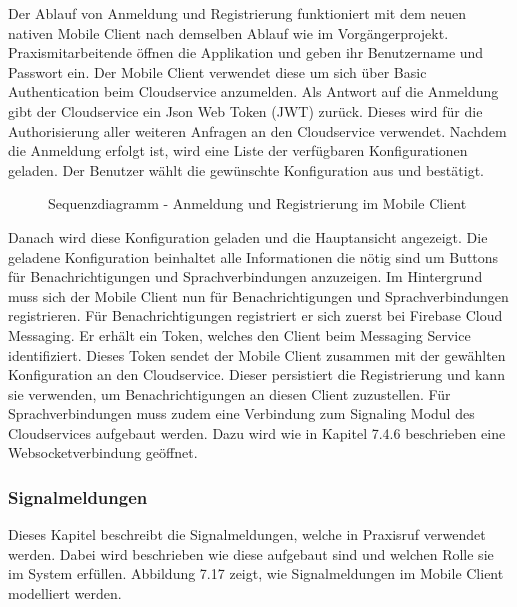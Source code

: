 Der Ablauf von Anmeldung und Registrierung funktioniert mit dem neuen nativen Mobile Client nach demselben Ablauf wie im Vorgängerprojekt.
Praxismitarbeitende öffnen die Applikation und geben ihr Benutzername und Passwort ein.
Der Mobile Client verwendet diese um sich über Basic Authentication beim Cloudservice anzumelden.
Als Antwort auf die Anmeldung gibt der Cloudservice ein Json Web Token (JWT) zurück.
Dieses wird für die Authorisierung aller weiteren Anfragen an den Cloudservice verwendet.
Nachdem die Anmeldung erfolgt ist, wird eine Liste der verfügbaren Konfigurationen geladen.
Der Benutzer wählt die gewünschte Konfiguration aus und bestätigt.

\begin{figure}[h]
    \centering
    \begin{minipage}[b]{0.9\textwidth}
        \caption{Sequenzdiagramm - Anmeldung und Registrierung im Mobile Client}
    \end{minipage}
\end{figure}

Danach wird diese Konfiguration geladen und die Hauptansicht angezeigt.
Die geladene Konfiguration beinhaltet alle Informationen die nötig sind um Buttons für Benachrichtigungen und Sprachverbindungen anzuzeigen.
Im Hintergrund muss sich der Mobile Client nun für Benachrichtigungen und Sprachverbindungen registrieren.
Für Benachrichtigungen registriert er sich zuerst bei Firebase Cloud Messaging.
Er erhält ein Token, welches den Client beim Messaging Service identifiziert.
Dieses Token sendet der Mobile Client zusammen mit der gewählten Konfiguration an den Cloudservice.
Dieser persistiert die Registrierung und kann sie verwenden, um Benachrichtigungen an diesen Client zuzustellen.
Für Sprachverbindungen muss zudem eine Verbindung zum Signaling Modul des Cloudservices aufgebaut werden.
Dazu wird wie in Kapitel 7.4.6 beschrieben eine Websocketverbindung geöffnet.

\clearpage

\subsubsection{Signalmeldungen}

Dieses Kapitel beschreibt die Signalmeldungen, welche in Praxisruf verwendet werden.
Dabei wird beschrieben wie diese aufgebaut sind und welchen Rolle sie im System erfüllen.
Abbildung 7.17 zeigt, wie Signalmeldungen im Mobile Client modelliert werden.

